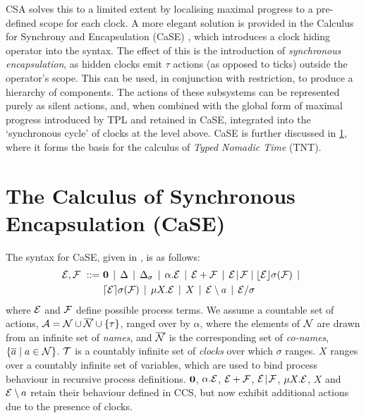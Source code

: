 CSA solves this to a limited extent by localising maximal progress to
a pre-defined scope for each clock.  A more elegant solution is
provided in the Calculus for Synchrony and Encapsulation (CaSE)
\cite{CaSE}, which introduces a clock hiding operator into the syntax.
The effect of this is the introduction of \emph{synchronous
  encapsulation}, as hidden clocks emit $\tau$ actions (as opposed to
ticks) outside the operator's scope.  This can be used, in conjunction
with restriction, to produce a hierarchy of components.  The actions
of these subsystems can be represented purely as silent actions, and,
when combined with the global form of maximal progress introduced by
TPL and retained in CaSE, integrated into the `synchronous cycle'
\cite{CaSE} of clocks at the level above.  CaSE is further discussed
in \ref{case}, where it forms the basis for the calculus of
\emph{Typed Nomadic Time} (TNT).

\section{The Calculus of Synchronous \\ Encapsulation (CaSE)}
\label{case}

The syntax for CaSE, given in \cite{norton05alg}, is as follows:
\begin{equation}
  \begin{aligned}
    \text{$\mathcal{E}$}, \text{$\mathcal{F}$}\ ::=\ &
    \textbf{0}  \;\,|\,\; 
    \Delta \;\,|\,\; 
    \Delta_{\sigma} \;\,|\,\; 
    \alpha . \text{$\mathcal{E}$}  \;\,|\,\;
    \text{$\mathcal{E}$} + \text{$\mathcal{F}$} \;\,|\,\; 
   \text{$\mathcal{E}$} \mathrel{\!|\!} \text{$\mathcal{F}$} \mid
    \lfloor{\text{$\mathcal{E}$}}\rfloor {\sigma} ({\text{$\mathcal{F}$}}) \;\,|\,\; \\
    & \lceil{\text{$\mathcal{E}$}}\rceil {\sigma} ({\text{$\mathcal{F}$}}) \;\,|\,\; 
    \mu X . \text{$\mathcal{E}$} \;\,|\,\; 
    X \;\,|\,\; 
    \text{$\mathcal{E}$} \setminus a \;\,|\,\; 
    \text{$\mathcal{E}$} / \sigma
  \end{aligned}
\end{equation}
where $\text{$\mathcal{E}$}$ and $\text{$\mathcal{F}$}$ define possible process terms. We assume a
countable set of actions, $\text{$\mathcal{A}$} = \text{$\mathcal{N}$} \cup \text{$\overline{\text{$\mathcal{N}$}}$} \cup
\{\tau\}$, ranged over by $\alpha$, where the elements of $\text{$\mathcal{N}$}$ are
drawn from an infinite set of \emph{names}, and $\text{$\overline{\text{$\mathcal{N}$}}$}$ is the
corresponding set of \emph{co-names}, $\{\overline{a} \mid a \in
\text{$\mathcal{N}$}\}$. $\text{$\mathcal{T}$}$ is a countably infinite set of \emph{clocks} over
which $\sigma$ ranges. $X$ ranges over a countably infinite set of variables, which are used to bind process
behaviour in recursive process definitions. $\textbf{0}$, $\alpha . \text{$\mathcal{E}$}$,
$\text{$\mathcal{E}$} + \text{$\mathcal{F}$}$, $\text{$\mathcal{E}$} \mathrel{\!|\!} \text{$\mathcal{F}$}$, $\mu X
. \text{$\mathcal{E}$}$, $X$ and $\text{$\mathcal{E}$} \setminus a$ retain their behaviour defined in
CCS, but now exhibit additional actions due to the presence of clocks.

